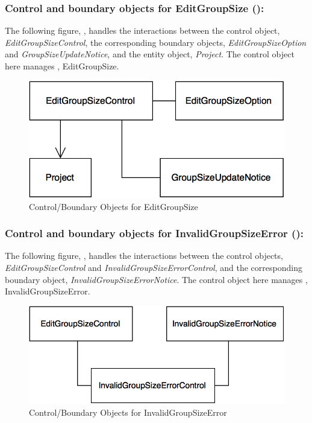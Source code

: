 \documentclass[12pt,letterpaper]{article}
\begin{document}
\newpage{}

\subsubsection*{Control and boundary objects for EditGroupSize ():}

The following figure, , handles the interactions between the control object, {\it EditGroupSizeControl}, the corresponding boundary objects, 
{\it EditGroupSizeOption} and {\it GroupSizeUpdateNotice}, and the entity object, {\it Project}. The control object here manages , EditGroupSize.

\begin{figure}[H]
	\centering{}
	\includegraphics[scale=0.37]{imgs/cbod/edit-group-size.png}
	\caption{Control/Boundary Objects for EditGroupSize}
\end{figure}

\subsubsection*{Control and boundary objects for InvalidGroupSizeError ():}

The following figure, , handles the interactions between the control objects, {\it EditGroupSizeControl} and {\it InvalidGroupSizeErrorControl}, and the corresponding boundary object, {\it InvalidGroupSizeErrorNotice}. The control object here manages , InvalidGroupSizeError.

\begin{figure}[H]
	\centering{}
	\includegraphics[scale=0.37]{imgs/cbod/invalid-group-size-error.png}
	\caption{Control/Boundary Objects for InvalidGroupSizeError}
\end{figure}
\end{document}
